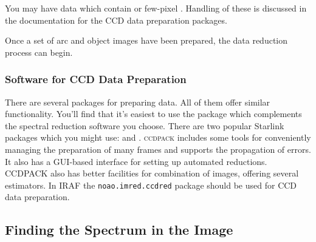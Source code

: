 \documentclass[twoside,11pt]{starlink}
\providecommand{\mlabel}[1]{\xlabel{#1}\label{#1}}
\begin{document}
You may have data which contain  or
few-pixel .
Handling of these is discussed in the documentation for the CCD data
preparation packages.

Once a set of arc and object images have been prepared, the data
reduction process can begin.


\subsubsection{Software for CCD Data Preparation}

There are several packages for preparing  data.
All of them offer similar functionality.
You'll find that it's easiest to use the package which complements
the spectral reduction software you choose.
There are two popular Starlink packages which you might use:
 and \@.
\textsc{ccdpack} includes some tools for conveniently managing the preparation
of many frames and supports the propagation of errors.
It also has a GUI-based interface for setting up automated reductions.
CCDPACK also has better facilities for combination of images, offering
several estimators.
In IRAF the \texttt{noao.imred.ccdred} package should be used for CCD
data preparation.


\subsection{\mlabel{finding_spectrum}Finding the Spectrum in the Image}
\end{document}
